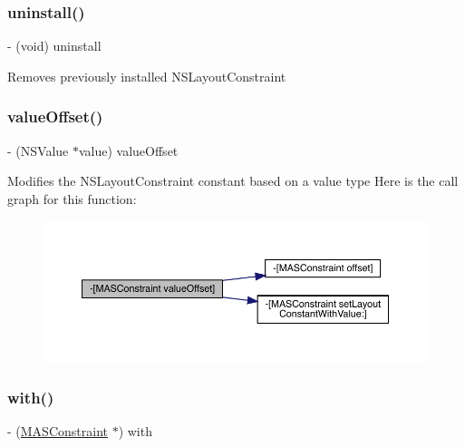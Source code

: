 \subsubsection{\texorpdfstring{uninstall()}{uninstall()}}
{\footnotesize\ttfamily -\/ (void) uninstall \begin{DoxyParamCaption}{ }\end{DoxyParamCaption}}

Removes previously installed N\+S\+Layout\+Constraint \mbox{\label{interface_m_a_s_constraint_ab0ac0ed821e4b7ff3bda18c9be98776b}} 
\subsubsection{\texorpdfstring{value\+Offset()}{valueOffset()}}
{\footnotesize\ttfamily -\/ (N\+S\+Value $\ast$value) value\+Offset \begin{DoxyParamCaption}{ }\end{DoxyParamCaption}}

Modifies the N\+S\+Layout\+Constraint constant based on a value type Here is the call graph for this function\+:\nopagebreak
\begin{figure}[H]
\begin{center}
\leavevmode
\includegraphics[width=350pt]{interface_m_a_s_constraint_ab0ac0ed821e4b7ff3bda18c9be98776b_cgraph}
\end{center}
\end{figure}
\mbox{\label{interface_m_a_s_constraint_aabffb284a73bb8595edf6e0998162004}} 
\subsubsection{\texorpdfstring{with()}{with()}}
{\footnotesize\ttfamily -\/ (\mbox{\hyperlink{interface_m_a_s_constraint}{M\+A\+S\+Constraint}} $\ast$) with \begin{DoxyParamCaption}{ }\end{DoxyParamCaption}}


